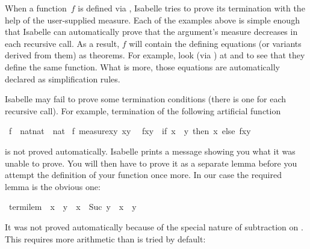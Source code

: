 %
\begin{isabellebody}%
\def\isabellecontext{termination}%
%
\begin{isamarkuptext}%
When a function~$f$ is defined via , Isabelle tries to prove
its termination with the help of the user-supplied measure.  Each of the examples
above is simple enough that Isabelle can automatically prove that the
argument's measure decreases in each recursive call. As a result,
$f$ will contain the defining equations (or variants derived
from them) as theorems. For example, look (via ) at
 and  to see that they define
the same function. What is more, those equations are automatically declared as
simplification rules.

Isabelle may fail to prove some termination conditions
(there is one for each recursive call).  For example,
termination of the following artificial function%
\end{isamarkuptext}%
\ f\ {\isacharcolon}{\isacharcolon}\ {\isachardoublequote}nat{\isasymtimes}nat\ {\isasymRightarrow}\ nat{\isachardoublequote}\isanewline
{}\ f\ {\isachardoublequote}measure{\isacharparenleft}{\isasymlambda}{\isacharparenleft}x{\isacharcomma}y{\isacharparenright}{\isachardot}\ x{\isacharminus}y{\isacharparenright}{\isachardoublequote}\isanewline
\ \ {\isachardoublequote}f{\isacharparenleft}x{\isacharcomma}y{\isacharparenright}\ {\isacharequal}\ {\isacharparenleft}if\ x\ {\isasymle}\ y\ then\ x\ else\ f{\isacharparenleft}x{\isacharcomma}y{\isacharplus}{}{\isacharparenright}{\isacharparenright}{\isachardoublequote}%
\begin{isamarkuptext}%
\noindent
is not proved automatically. Isabelle prints a
message showing you what it was unable to prove. You will then
have to prove it as a separate lemma before you attempt the definition
of your function once more. In our case the required lemma is the obvious one:%
\end{isamarkuptext}%
\ termi{\isacharunderscore}lem{\isacharcolon}\ {\isachardoublequote}{\isasymnot}\ x\ {\isasymle}\ y\ {\isasymLongrightarrow}\ x\ {\isacharminus}\ Suc\ y\ {\isacharless}\ x\ {\isacharminus}\ y{\isachardoublequote}%
\begin{isamarkuptxt}%
\noindent
It was not proved automatically because of the special nature of subtraction
on . This requires more arithmetic than is tried by default:%
\end{isamarkuptxt}%

\end{isabellebody}

